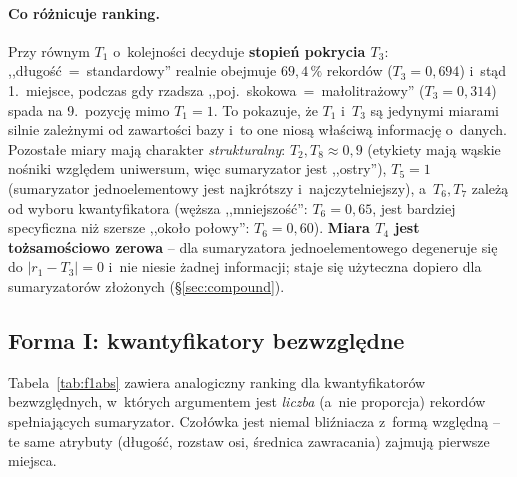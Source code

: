 \documentclass{article}
\begin{document}
\paragraph{Co różnicuje ranking.} Przy równym $T_1$ o~kolejności decyduje
\textbf{stopień pokrycia $T_3$}: ,,długość~=~standardowy'' realnie obejmuje
$69{,}4\,\%$ rekordów ($T_3 = 0{,}694$) i~stąd 1.~miejsce, podczas gdy
rzadsza ,,poj.\ skokowa~=~małolitrażowy'' ($T_3 = 0{,}314$) spada na
9.~pozycję mimo $T_1 = 1$. To pokazuje, że $T_1$ i~$T_3$ są jedynymi miarami
silnie zależnymi od zawartości bazy i~to one niosą właściwą informację
o~danych. Pozostałe miary mają charakter \emph{strukturalny}: $T_2, T_8
\approx 0{,}9$ (etykiety mają wąskie nośniki względem uniwersum, więc
sumaryzator jest ,,ostry''), $T_5 = 1$ (sumaryzator jednoelementowy jest
najkrótszy i~najczytelniejszy), a~$T_6, T_7$ zależą od wyboru kwantyfikatora
(węższa ,,mniejszość'': $T_6=0{,}65$, jest bardziej specyficzna niż szersze
,,około połowy'': $T_6=0{,}60$). \textbf{Miara $T_4$ jest tożsamościowo
zerowa} -- dla sumaryzatora jednoelementowego degeneruje się do $|r_1 - T_3|
= 0$ i~nie niesie żadnej informacji; staje się użyteczna dopiero dla
sumaryzatorów złożonych (\S\ref{sec:compound}).

\subsection{Forma I: kwantyfikatory bezwzględne}
\label{sec:f1abs}

Tabela~\ref{tab:f1abs} zawiera analogiczny ranking dla kwantyfikatorów
bezwzględnych, w~których argumentem jest \emph{liczba} (a~nie proporcja)
rekordów spełniających sumaryzator. Czołówka jest niemal bliźniacza
z~formą względną -- te same atrybuty (długość, rozstaw osi, średnica
zawracania) zajmują pierwsze miejsca.
\end{document}
